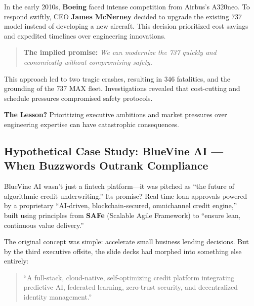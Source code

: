 \begin{tcolorbox}[colback=blue!5!white, colframe=blue!50!black,
  title={Historical Sidebar: Boeing 737 MAX — When Slides Overruled Safety}]

In the early 2010s, \textbf{Boeing} faced intense competition from Airbus's A320neo. To respond swiftly, CEO \textbf{James McNerney} decided to upgrade the existing 737 model instead of developing a new aircraft. This decision prioritized cost savings and expedited timelines over engineering innovations.

\medskip

\begin{quote}
\textbf{The implied promise:} \textit{We can modernize the 737 quickly and economically without compromising safety.}
\end{quote}

\medskip

This approach led to two tragic crashes, resulting in 346 fatalities, and the grounding of the 737 MAX fleet. Investigations revealed that cost-cutting and schedule pressures compromised safety protocols.

\medskip

\textbf{The Lesson?} Prioritizing executive ambitions and market pressures over engineering expertise can have catastrophic consequences.

\end{tcolorbox}


\subsection{Hypothetical Case Study: BlueVine AI — When Buzzwords Outrank Compliance}

BlueVine AI wasn’t just a fintech platform—it was pitched as “the future of algorithmic credit underwriting.” Its promise? Real-time loan approvals powered by a proprietary “AI-driven, blockchain-secured, omnichannel credit engine,” built using principles from \textbf{SAFe} (Scalable Agile Framework) to “ensure lean, continuous value delivery.”

The original concept was simple: accelerate small business lending decisions. But by the third executive offsite, the slide decks had morphed into something else entirely:  

\begin{quote}
“A full-stack, cloud-native, self-optimizing credit platform integrating predictive AI, federated learning, zero-trust security, and decentralized identity management.”  
\end{quote}

